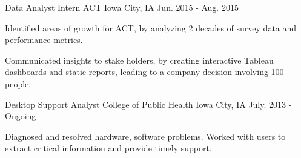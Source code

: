 \begin{cventries}
{\begin{cvitems}
      \end{cvitems}
    }
  \cventry
    {Data Analyst Intern}
    {ACT}
    {Iowa City, IA}
    {Jun. 2015 - Aug. 2015}
    {
      \begin{cvitems}
        \item {Identified areas of growth for ACT, by analyzing 2 decades of survey data and performance metrics.}
        \item {Communicated insights to stake holders, by creating interactive Tableau dashboards and static reports, leading to a company decision involving 100 people.}
      \end{cvitems}
    }
  \cventry
    {Desktop Support Analyst}
    {College of Public Health}
    {Iowa City, IA}
    {July. 2013 - Ongoing}
    {
      \begin{cvitems}
        \item {Diagnosed and resolved hardware, software problems. Worked with users to extract critical information and provide timely support. }
      \end{cvitems}
    }
\end{cventries}
